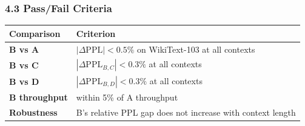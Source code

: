 \documentclass[
  11pt,
]{article}
\begin{document}
\hypertarget{passfail-criteria}{%
\subsubsection{4.3 Pass/Fail Criteria}\label{passfail-criteria}}

\begin{longtable}[]{@{}ll@{}}
\toprule
\begin{minipage}[b]{0.47\columnwidth}\raggedright
Comparison\strut
\end{minipage} & \begin{minipage}[b]{0.47\columnwidth}\raggedright
Criterion\strut
\end{minipage}\tabularnewline
\midrule
\endhead
\begin{minipage}[t]{0.47\columnwidth}\raggedright
\textbf{B vs A}\strut
\end{minipage} & \begin{minipage}[t]{0.47\columnwidth}\raggedright
\(|\Delta\mathrm{PPL}| < 0.5\%\) on WikiText-103 at all contexts\strut
\end{minipage}\tabularnewline
\begin{minipage}[t]{0.47\columnwidth}\raggedright
\textbf{B vs C}\strut
\end{minipage} & \begin{minipage}[t]{0.47\columnwidth}\raggedright
\(|\Delta\mathrm{PPL}_{B,C}| < 0.3\%\) at all contexts\strut
\end{minipage}\tabularnewline
\begin{minipage}[t]{0.47\columnwidth}\raggedright
\textbf{B vs D}\strut
\end{minipage} & \begin{minipage}[t]{0.47\columnwidth}\raggedright
\(|\Delta\mathrm{PPL}_{B,D}| < 0.3\%\) at all contexts\strut
\end{minipage}\tabularnewline
\begin{minipage}[t]{0.47\columnwidth}\raggedright
\textbf{B throughput}\strut
\end{minipage} & \begin{minipage}[t]{0.47\columnwidth}\raggedright
within 5\% of A throughput\strut
\end{minipage}\tabularnewline
\begin{minipage}[t]{0.47\columnwidth}\raggedright
\textbf{Robustness}\strut
\end{minipage} & \begin{minipage}[t]{0.47\columnwidth}\raggedright
B's relative PPL gap does not increase with context length\strut

\end{minipage}
\end{longtable}
\end{document}
